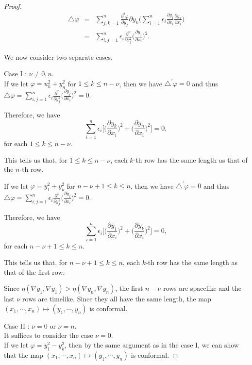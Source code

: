 \documentclass[a4paper,10pt]{amsart}
\theoremstyle{plain}
\newtheorem*{main theorem}{Theorem}
\theoremstyle{definition}
\begin{document}
\begin{proof}
\begin{eqnarray*}
\triangle \varphi & = & \sum\limits_{j,k=1}^n \frac{\partial^2
\varphi}{\partial y_j}{\partial y_k} \Big( \sum\limits_{i=1}^n
\epsilon_i \frac{\partial y_j}{\partial x_i} \frac{\partial
y_k}{\partial x_i} \Big)\\
& = & \sum\limits_{i,j=1}^n \epsilon_i \frac{\partial^
\varphi}{\partial y_j^2} \Big( \frac{\partial y_j}{\partial x_i}
\Big)^2.
\end{eqnarray*}

We now consider two separate cases.

Case I : $\nu \neq 0, n$.\\
If we let $\varphi = u_k^2 + y_n^2$ for $1 \leq k \leq n-\nu$,
then we have $\triangle^\prime \varphi = 0$ and thus $\triangle
\varphi = \sum\limits_{i,j=1}^n \epsilon_i \frac{\partial^
\varphi}{\partial y_j^2} \Big( \frac{\partial y_j}{\partial x_i}
\Big)^2 = 0$.

Therefore, we have
$$ \sum\limits_{i=1}^n \epsilon_i \Big[ \Big(\frac{\partial
y_k}{\partial x_i} \Big)^2 + \Big( \frac{\partial y_n}{\partial
x_i} \Big)^2 \Big] = 0,$$ for each $1 \leq k \leq n-\nu$.

This tells us that, for $1 \leq k \leq n-\nu$, each $k$-th row has
the same length as that of the $n$-th row.

If we let $\varphi = y_1^2 + y_k^2$ for $n-\nu+1 \leq k \leq n$,
then we have $\triangle^\prime \varphi = 0$ and thus $\triangle
\varphi = \sum\limits_{i,j=1}^n \epsilon_i \frac{\partial^
\varphi}{\partial y_j^2} \Big( \frac{\partial y_j}{\partial x_i}
\Big)^2 = 0$.

Therefore, we have
$$ \sum\limits_{i=1}^n \epsilon_i \Big[ \Big(\frac{\partial
y_1}{\partial x_i} \Big)^2 + \Big( \frac{\partial y_k}{\partial
x_i} \Big)^2 \Big] = 0,$$ for each $n-\nu+1 \leq k \leq n$.

This tells us that, for $n-\nu+1 \leq k \leq n$, each $k$-th row
has the same length as that of the first row.

Since $\eta(\nabla y_1, \nabla y_1)
> \eta(\nabla y_n, \nabla y_n)$, the first $n-\nu$ rows are
spacelike and the last $\nu$ rows are timelike. Since they all
have the same length, the map $(x_1, \cdots, x_n) \mapsto (y_1,
\cdots, y_n)$ is conformal.

Case II : $\nu=0$ or $\nu = n$.\\
It suffices to consider the case $\nu = 0$.\\
If we let $\varphi = y_1^2 - y_k^2$, then by the same argument as
in the case I, we can show that the map $(x_1, \cdots, x_n)
\mapsto (y_1, \cdots, y_n)$ is conformal.





\end{proof}
\end{document}
